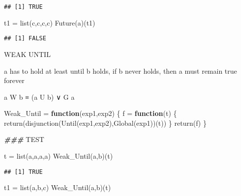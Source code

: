 \documentclass[
]{article}
\newenvironment{Shaded}{\begin{snugshade}}{\end{snugshade}}
\newcommand{\AlertTok}[1]{\textcolor[rgb]{0.94,0.16,0.16}{#1}}
\newcommand{\ControlFlowTok}[1]{\textcolor[rgb]{0.13,0.29,0.53}{\textbf{#1}}}
\newcommand{\DocumentationTok}[1]{\textcolor[rgb]{0.56,0.35,0.01}{\textbf{\textit{#1}}}}
\newcommand{\FunctionTok}[1]{\textcolor[rgb]{0.00,0.00,0.00}{#1}}
\newcommand{\NormalTok}[1]{#1}
\newcommand{\OtherTok}[1]{\textcolor[rgb]{0.56,0.35,0.01}{#1}}
\newcommand{\StringTok}[1]{\textcolor[rgb]{0.31,0.60,0.02}{#1}}
\begin{document}
\begin{verbatim}
## [1] TRUE
\end{verbatim}

\begin{Shaded}
\begin{Highlighting}[]
\NormalTok{t1 }\OtherTok{=} \FunctionTok{list}\NormalTok{(}\StringTok{\textquotesingle{}c\textquotesingle{}}\NormalTok{,}\StringTok{\textquotesingle{}c\textquotesingle{}}\NormalTok{,}\StringTok{\textquotesingle{}c\textquotesingle{}}\NormalTok{,}\StringTok{\textquotesingle{}c\textquotesingle{}}\NormalTok{)}
\FunctionTok{Future}\NormalTok{(a)(t1)}
\end{Highlighting}
\end{Shaded}

\begin{verbatim}
## [1] FALSE
\end{verbatim}

WEAK UNTIL

a has to hold at least until b holds, if b never holds, then a must
remain true forever

a W b ≡ (a U b) ∨ G a

\begin{Shaded}
\begin{Highlighting}[]
\NormalTok{Weak\_Until }\OtherTok{=} \ControlFlowTok{function}\NormalTok{(exp1,exp2)}
\NormalTok{\{}
\NormalTok{  f }\OtherTok{=} \ControlFlowTok{function}\NormalTok{(t)}
\NormalTok{  \{}
    \FunctionTok{return}\NormalTok{(}\FunctionTok{disjunction}\NormalTok{(}\FunctionTok{Until}\NormalTok{(exp1,exp2),}\FunctionTok{Global}\NormalTok{(exp1))(t))}
\NormalTok{  \}}
  \FunctionTok{return}\NormalTok{(f)}
\NormalTok{\}}

\DocumentationTok{\#\#\# }\AlertTok{TEST}\DocumentationTok{ }

\NormalTok{t }\OtherTok{=} \FunctionTok{list}\NormalTok{(}\StringTok{\textquotesingle{}a\textquotesingle{}}\NormalTok{,}\StringTok{\textquotesingle{}a\textquotesingle{}}\NormalTok{,}\StringTok{\textquotesingle{}a\textquotesingle{}}\NormalTok{,}\StringTok{\textquotesingle{}a\textquotesingle{}}\NormalTok{)}
\FunctionTok{Weak\_Until}\NormalTok{(a,b)(t)}
\end{Highlighting}
\end{Shaded}

\begin{verbatim}
## [1] TRUE
\end{verbatim}

\begin{Shaded}
\begin{Highlighting}[]
\NormalTok{t1 }\OtherTok{=} \FunctionTok{list}\NormalTok{(}\StringTok{\textquotesingle{}a\textquotesingle{}}\NormalTok{,}\StringTok{\textquotesingle{}b\textquotesingle{}}\NormalTok{,}\StringTok{\textquotesingle{}c\textquotesingle{}}\NormalTok{)}
\FunctionTok{Weak\_Until}\NormalTok{(a,b)(t)}
\end{Highlighting}
\end{Shaded}
\end{document}
